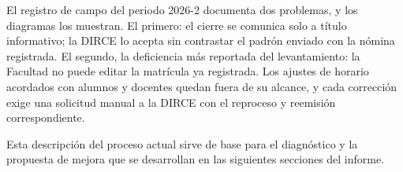 El registro de campo del periodo 2026-2 documenta dos problemas, y los diagramas los muestran. El primero: el cierre se comunica solo a t\'itulo informativo; la DIRCE lo acepta sin contrastar el padr\'on enviado con la n\'omina registrada. El segundo, la deficiencia m\'as reportada del levantamiento: la Facultad no puede editar la matr\'icula ya registrada. Los ajustes de horario acordados con alumnos y docentes quedan fuera de su alcance, y cada correcci\'on exige una solicitud manual a la DIRCE con el reproceso y reemisi\'on correspondiente.

Esta descripci\'on del proceso actual sirve de base para el diagn\'ostico y la propuesta de mejora que se desarrollan en las siguientes secciones del informe.
